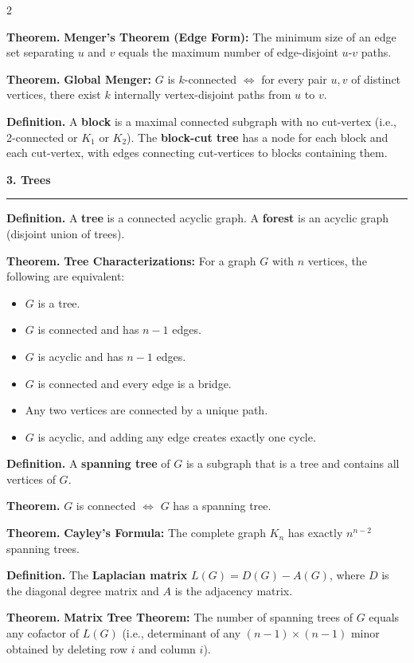 \documentclass[8pt,landscape,a4paper]{extarticle}
\newcommand{\thm}[1]{\begin{mdframed}[style=theorembox]\textbf{Theorem.} #1\end{mdframed}}
\newcommand{\defn}[1]{\begin{mdframed}[style=defbox]\textbf{Definition.} #1\end{mdframed}}
\newcommand{\heading}[1]{\vspace{1pt}\noindent\textbf{\large #1}\vspace{1pt}\hrule\vspace{2pt}}
\begin{document}
\begin{multicols}{2}
\thm{\textbf{Menger's Theorem (Edge Form):} The minimum size of an edge set separating $u$ and $v$ equals the maximum number of edge-disjoint $u$-$v$ paths.}

\thm{\textbf{Global Menger:} $G$ is $k$-connected $\iff$ for every pair $u,v$ of distinct vertices, there exist $k$ internally vertex-disjoint paths from $u$ to $v$.}

\defn{A \textbf{block} is a maximal connected subgraph with no cut-vertex (i.e., 2-connected or $K_1$ or $K_2$). The \textbf{block-cut tree} has a node for each block and each cut-vertex, with edges connecting cut-vertices to blocks containing them.}

\heading{3. Trees}

\defn{A \textbf{tree} is a connected acyclic graph. A \textbf{forest} is an acyclic graph (disjoint union of trees).}

\thm{\textbf{Tree Characterizations:} For a graph $G$ with $n$ vertices, the following are equivalent:
\begin{itemize}[nosep]
    \item $G$ is a tree.
    \item $G$ is connected and has $n-1$ edges.
    \item $G$ is acyclic and has $n-1$ edges.
    \item $G$ is connected and every edge is a bridge.
    \item Any two vertices are connected by a unique path.
    \item $G$ is acyclic, and adding any edge creates exactly one cycle.
\end{itemize}}

\defn{A \textbf{spanning tree} of $G$ is a subgraph that is a tree and contains all vertices of $G$.}

\thm{$G$ is connected $\iff$ $G$ has a spanning tree.}

\thm{\textbf{Cayley's Formula:} The complete graph $K_n$ has exactly $n^{n-2}$ spanning trees.}

\defn{The \textbf{Laplacian matrix} $L(G) = D(G) - A(G)$, where $D$ is the diagonal degree matrix and $A$ is the adjacency matrix.}

\thm{\textbf{Matrix Tree Theorem:} The number of spanning trees of $G$ equals any cofactor of $L(G)$ (i.e., determinant of any $(n-1) \times (n-1)$ minor obtained by deleting row $i$ and column $i$).}


\end{multicols}
\end{document}
